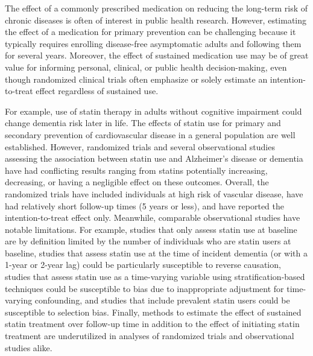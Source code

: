 \documentclass[
]{book}
\begin{document}
The effect of a commonly prescribed medication on reducing the long-term risk of chronic
diseases is often of interest in public health research. However, estimating the effect of a medication for primary prevention can be challenging because it typically requires enrolling disease-free asymptomatic adults and following them for several years. Moreover, the effect of sustained medication use may be of great value for informing personal, clinical, or public health decision-making, even though randomized clinical trials often emphasize or solely estimate an intention-to-treat effect regardless of sustained use\autocite{hernan_itt2012}.

For example, use of statin therapy in adults without cognitive impairment could change dementia risk later in life. The effects of statin use for primary and secondary prevention of cardiovascular disease in a general population are well established\autocite{naci2013,taylor2013,udell2006}. However, randomized trials\autocite{mrc2002,trompet2010} and several observational studies assessing the association between statin use and Alzheimer's disease or dementia have had conflicting results ranging from statins potentially increasing, decreasing, or having a negligible effect on these outcomes. Overall, the randomized trials have included individuals at high risk of vascular disease, have had relatively short follow-up times (5 years or less), and have reported the intention-to-treat effect only\autocite{mrc2002,trompet2010}. Meanwhile, comparable observational studies have notable limitations\autocite{power2015}. For example, studies that only assess statin use at baseline are by definition limited by the number of individuals who are statin users at baseline\autocite{arvanitakis2008,szwast2007,zandi2005,ancelin2012,smeeth2009,wolozin2007}, studies that assess statin use at the time of incident dementia (or with a 1-year or 2-year lag) could be particularly susceptible to reverse causation\autocite{haag2009,cramer2008,bettermann2012,beydoun2011,li2004,li2010,rea2005}, studies that assess statin use as a time-varying variable using stratification-based techniques could be susceptible to bias due to inappropriate adjustment for time-varying confounding\autocite{bettermann2012,beydoun2011,bernick2005,sparks2008,steenland2013,starr2004,cox2010}, and studies that include prevalent statin users could be susceptible to selection bias\autocite{arvanitakis2008,szwast2007,zandi2005,ancelin2012,wolozin2007,haag2009,cramer2008,beydoun2011,li2004,li2010,rea2005,bernick2005,steenland2013,starr2004}. Finally, methods to estimate the effect of sustained statin treatment over follow-up time in addition to the effect of initiating statin treatment are underutilized in analyses of randomized trials and observational studies alike\autocite{ray2003}.
\end{document}
